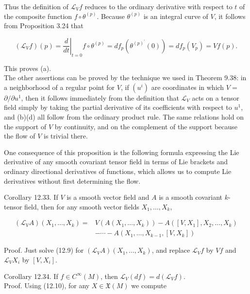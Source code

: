\documentclass[10pt, letterpaper]{article}
\begin{document}
Thus the definition of $\mathscr{L}_{V} f$ reduces to the ordinary derivative with respect to $t$ of the composite function $f \circ \theta^{(p)}$. Because $\theta^{(p)}$ is an integral curve of $V$, it follows from Proposition 3.24 that

$$
\left(\mathscr{L}_{V} f\right)(p)=\left.\frac{d}{d t}\right|_{t=0} f \circ \theta^{(p)}=d f_{p}\left(\theta^{(p)^{\prime}}(0)\right)=d f_{p}\left(V_{p}\right)=V f(p) .
$$

This proves (a).\\
The other assertions can be proved by the technique we used in Theorem 9.38: in a neighborhood of a regular point for $V$, if $\left(u^{i}\right)$ are coordinates in which $V=$ $\partial / \partial u^{1}$, then it follows immediately from the definition that $\mathscr{L}_{V}$ acts on a tensor field simply by taking the partial derivative of its coefficients with respect to $u^{1}$, and (b)(d) all follow from the ordinary product rule. The same relations hold on the support of $V$ by continuity, and on the complement of the support because the flow of $V$ is trivial there.

One consequence of this proposition is the following formula expressing the Lie derivative of any smooth covariant tensor field in terms of Lie brackets and ordinary directional derivatives of functions, which allows us to compute Lie derivatives without first determining the flow.

Corollary 12.33. If $V$ is a smooth vector field and $A$ is a smooth covariant $k$-tensor field, then for any smooth vector fields $X_{1}, \ldots, X_{k}$,

$$
\begin{aligned}
\left(\mathscr{L}_{V} A\right)\left(X_{1}, \ldots, X_{k}\right)= & V\left(A\left(X_{1}, \ldots, X_{k}\right)\right)-A\left(\left[V, X_{1}\right], X_{2}, \ldots, X_{k}\right) \\
& -\cdots-A\left(X_{1}, \ldots, X_{k-1},\left[V, X_{k}\right]\right)
\end{aligned}
$$

Proof. Just solve (12.9) for $\left(\mathscr{L}_{V} A\right)\left(X_{1}, \ldots, X_{k}\right)$, and replace $\mathscr{L}_{V} f$ by $V f$ and $\mathscr{L}_{V} X_{i}$ by $\left[V, X_{i}\right]$.

Corollary 12.34. If $f \in C^{\infty}(M)$, then $\mathscr{L}_{V}(d f)=d\left(\mathscr{L}_{V} f\right)$.\\
Proof. Using (12.10), for any $X \in \mathfrak{X}(M)$ we compute
\end{document}
